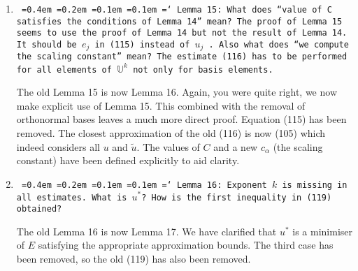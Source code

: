 \documentclass[12pt]{article}
\newcommand*\justify{%
	\fontdimen2\font=0.4em%
	\fontdimen3\font=0.2em%
	\fontdimen4\font=0.1em%
	\fontdimen7\font=0.1em%
	\hyphenchar\font=`\-%
}
\newcommand{\review}[1]{\texttt{\justify{#1}}}
\begin{document}
\begin{enumerate}
	\item \review{Lemma 15: What does ``value of $C$ satisfies the conditions of Lemma 14'' mean? The proof of Lemma 15 seems to use the proof of Lemma 14 but not the result of Lemma 14. It should be $e_j$ in (115) instead of $u_j$ . Also what does ``we compute the scaling constant'' mean? The estimate (116) has to be performed for all elements of $\mathbb U^k$ not only for basis elements.}
	
	The old Lemma 15 is now Lemma 16. Again, you were quite right, we now make explicit use of Lemma 15. This combined with the removal of orthonormal bases leaves a much more direct proof. Equation (115) has been removed. The closest approximation of the old (116) is now (105) which indeed considers all $u$ and $\tilde{u}$. The values of $C$ and a new $c_\alpha$ (the scaling constant) have been defined explicitly to aid clarity.
	
	\item \review{Lemma 16: Exponent $k$ is missing in all estimates. What is $u^*$? How is the first inequality in (119) obtained?}
	
	The old Lemma 16 is now Lemma 17. We have clarified that $u^*$ is a minimiser of $E$ satisfying the appropriate approximation bounds. The third case has been removed, so the old (119) has also been removed.
\end{enumerate}
\end{document}
